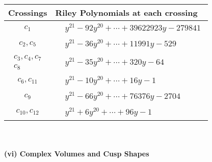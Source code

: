 \documentclass[1p]{elsarticle_modified}
\theoremstyle{definition}
\begin{document}
\begin{tabular}{m{50pt}|m{274pt}}
Crossings & \hspace{64pt}Riley Polynomials at each crossing \\
\hline $$\begin{aligned}c_{1}\end{aligned}$$&$\begin{aligned}
&y^{21}-92 y^{20}+\cdots+39622923 y-279841
\end{aligned}$\\
\hline $$\begin{aligned}c_{2},c_{5}\end{aligned}$$&$\begin{aligned}
&y^{21}-36 y^{20}+\cdots+11991 y-529
\end{aligned}$\\
\hline $$\begin{aligned}c_{3},c_{4},c_{7}\\c_{8}\end{aligned}$$&$\begin{aligned}
&y^{21}-35 y^{20}+\cdots+320 y-64
\end{aligned}$\\
\hline $$\begin{aligned}c_{6},c_{11}\end{aligned}$$&$\begin{aligned}
&y^{21}-10 y^{20}+\cdots+16 y-1
\end{aligned}$\\
\hline $$\begin{aligned}c_{9}\end{aligned}$$&$\begin{aligned}
&y^{21}-66 y^{20}+\cdots+76376 y-2704
\end{aligned}$\\
\hline $$\begin{aligned}c_{10},c_{12}\end{aligned}$$&$\begin{aligned}
&y^{21}+6 y^{20}+\cdots+96 y-1
\end{aligned}$\\
\hline
\end{tabular}\\~\\
\newpage\flushleft \textbf{(vi) Complex Volumes and Cusp Shapes}
\end{document}
